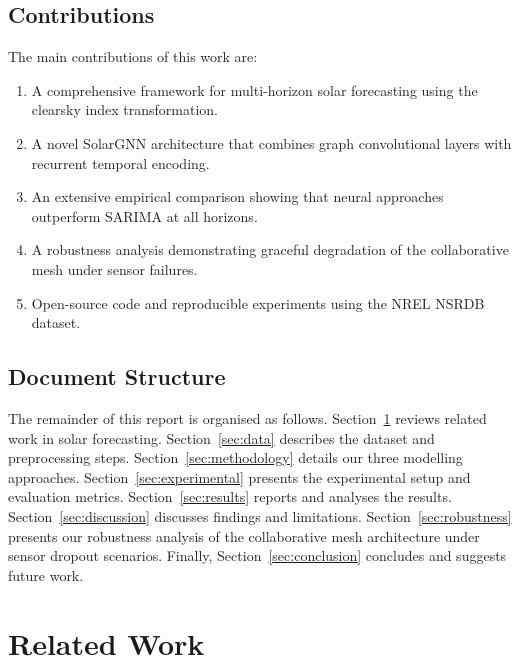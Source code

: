 \documentclass[11pt,a4paper]{article}
\begin{document}
\subsection{Contributions}

The main contributions of this work are:

\begin{enumerate}[noitemsep]
    \item A comprehensive framework for multi-horizon solar forecasting using the clearsky index transformation.
    \item A novel SolarGNN architecture that combines graph convolutional layers with recurrent temporal encoding.
    \item An extensive empirical comparison showing that neural approaches outperform SARIMA at all horizons.
    \item A robustness analysis demonstrating graceful degradation of the collaborative mesh under sensor failures.
    \item Open-source code and reproducible experiments using the NREL NSRDB dataset.
\end{enumerate}

\subsection{Document Structure}

The remainder of this report is organised as follows. Section~\ref{sec:related_work} reviews related work in solar forecasting. Section~\ref{sec:data} describes the dataset and preprocessing steps. Section~\ref{sec:methodology} details our three modelling approaches. Section~\ref{sec:experimental} presents the experimental setup and evaluation metrics. Section~\ref{sec:results} reports and analyses the results. Section~\ref{sec:discussion} discusses findings and limitations. Section~\ref{sec:robustness} presents our robustness analysis of the collaborative mesh architecture under sensor dropout scenarios. Finally, Section~\ref{sec:conclusion} concludes and suggests future work.

\section{Related Work}
\label{sec:related_work}
\end{document}
